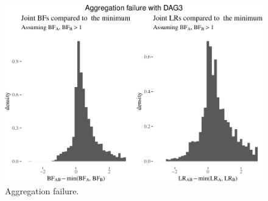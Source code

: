 \documentclass[
  10pt,
  dvipsnames,enabledeprecatedfontcommands]{scrartcl}
\begin{document}
\begin{figure}

\begin{center}\includegraphics[width=1\linewidth]{conjunction-appendix13_files/figure-latex/unnamed-chunk-31-1} \end{center}
\caption{Aggregation failure.} 
\label{fig:aggregationFails}
\end{figure}
\end{document}
